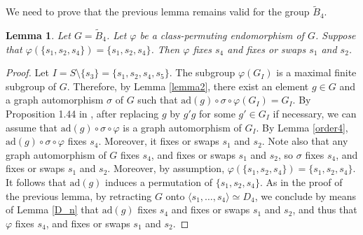 \documentclass[a4paper, 11pt]{amsart}
\newtheorem{lemme}[te]{Lemma}
\theoremstyle{definition}
\theoremstyle{remark}
\begin{document}
We need to prove that the previous lemma remains valid for the group $\tilde{B}_4$.

\begin{lemme}\label{B4}
Let $G=\tilde{B}_4$. Let $\varphi$ be a class-permuting endomorphism of $G$. Suppose that $\varphi(\lbrace s_1,s_2,s_4\rbrace)=\lbrace s_1,s_2,s_4\rbrace$. Then $\varphi$ fixes $s_4$ and fixes or swaps $s_1$ and $s_2$.\end{lemme}

\begin{proof}Let $I=S\setminus \lbrace s_{3} \rbrace =\lbrace s_1,s_2,s_4,s_5\rbrace$. The subgroup $\varphi(G_I)$ is a maximal finite subgroup of $G$. Therefore, by Lemma \ref{lemma2}, there exist an element $g\in G$ and a graph automorphism $\sigma$ of $G$ such that $\mathrm{ad}(g)\circ \sigma \circ \varphi(G_I)=G_I$. By Proposition 1.44 in \cite{franz}, after replacing $g$ by $g'g$ for some $g'\in G_I$ if necessary, we can assume that $\mathrm{ad}(g)\circ \sigma \circ \varphi$ is a graph automorphism of $G_I$. By Lemma \ref{order4}, $\mathrm{ad}(g)\circ \sigma \circ \varphi$ fixes $s_4$. Moreover, it fixes or swaps $s_1$ and $s_2$. Note also that any graph automorphism of $G$ fixes $s_4$, and fixes or swaps $s_1$ and $s_2$, so $\sigma$ fixes $s_4$, and fixes or swaps $s_1$ and $s_2$. Moreover, by assumption, $\varphi(\lbrace s_1,s_2,s_4\rbrace)=\lbrace s_1,s_2,s_4\rbrace$. It follows that $\mathrm{ad}(g)$ induces a permutation of $\lbrace s_1,s_2,s_4\rbrace$. As in the proof of the previous lemma, by retracting $G$ onto $\langle s_1,\ldots,s_4\rangle\simeq D_4$, we conclude by means of Lemma \ref{D_n} that $\mathrm{ad}(g)$ fixes $s_4$ and fixes or swaps $s_1$ and $s_2$, and thus that $\varphi$ fixes $s_4$, and fixes or swaps $s_1$ and $s_2$.\end{proof}
\end{document}
